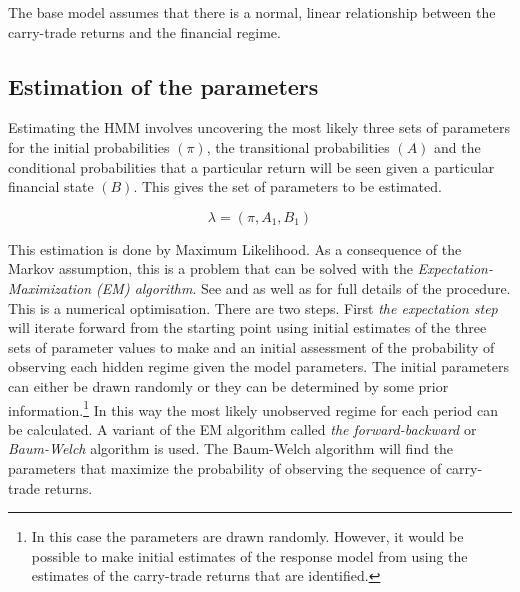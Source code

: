 \documentclass[12pt, a4paper, oneside]{article} %
\begin{document}
The base model assumes that there is a normal, linear relationship between the carry-trade returns and the financial regime.

 
\subsection{Estimation of the parameters}
Estimating the HMM involves uncovering the most likely three sets of parameters for the initial probabilities $(\pi)$, the transitional probabilities $(A)$ and the conditional probabilities that a particular return will be seen given a particular financial state $(B)$.  This gives the set of parameters to be estimated. 

\begin{equation}
\lambda = (\pi, A_1, B_1)
\end{equation}

This estimation is done by Maximum Likelihood. As a consequence of the Markov assumption, this is a problem that can be solved with the \emph{Expectation-Maximization (EM) algorithm}.  See \citet{dempster1977maximum} and \citet{Hamilton1989} as well as \citet{depmixS4} for full details of the procedure.  This is a numerical optimisation.  There are two steps. First \emph{the expectation step} will iterate forward from the starting point using initial estimates of the three sets of parameter values  to make and an initial assessment of the probability of observing each hidden regime given the model parameters.  The initial parameters can either be drawn randomly or they can be determined by some prior information.\footnote{In this case the parameters are drawn randomly.  However, it would be possible to make initial estimates of the response model from \citet{Hayward2013} using the estimates of the carry-trade returns that are identified.}  In this way the most likely unobserved regime for each period can be calculated. A variant of the EM algorithm called \emph{the forward-backward} or \emph{Baum-Welch} algorithm \citet{Baum1970} is used.   The Baum-Welch algorithm will find the parameters that maximize the probability of observing the sequence of carry-trade returns.  
\end{document}
